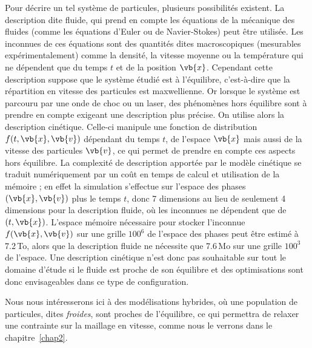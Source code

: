 Pour décrire un tel système de particules, plusieurs possibilités existent. La description dite fluide, qui prend en compte les équations de la mécanique des fluides (comme les équations d’Euler ou de Navier-Stokes) peut être utilisée. Les inconnues de ces équations sont des quantités dites macroscopiques (mesurables expérimentalement) comme la densité, la vitesse moyenne ou la température qui ne dépendent que du temps $t$ et de la position $\vb{x}$. Cependant cette description suppose que le système étudié est à l’équilibre, c’est-à-dire que la répartition en vitesse des particules est maxwellienne. Or lorsque le système est parcouru par une onde de choc ou un laser, des phénomènes hors équilibre sont à prendre en compte exigeant une description plus précise. On utilise alors la description cinétique. Celle-ci manipule une fonction de distribution $f(t,\vb{x},\vb{v})$ dépendant du temps $t$, de l’espace $\vb{x}$ mais aussi de la vitesse des particules $\vb{v}$, ce qui permet de prendre en compte ces aspects hors équilibre. La complexité de description apportée par le modèle cinétique se traduit numériquement par un coût en temps de calcul et utilisation de la mémoire ; en effet la simulation s’effectue sur l'espace des phases $(\vb{x},\vb{v})$ plus le temps $t$, donc 7 dimensions au lieu de seulement 4 dimensions pour la description fluide, où les inconnues ne dépendent que de $(t,\vb{x})$. L’espace mémoire nécessaire pour stocker l'inconnue $f(\vb{x},\vb{v})$ sur une grille $100^6$ de l’espace des phases peut être estimé à 7.2\,To, alors que la description fluide ne nécessite que 7.6\,Mo sur une grille $100^3$ de l’espace. Une description cinétique n’est donc pas souhaitable sur tout le domaine d’étude si le fluide est proche de son équilibre et des optimisations sont donc envisageables dans ce type de configuration.

Nous nous intéresserons ici à des modélisations hybrides, où une population de particules, dites \emph{froides}, sont proches de l'équilibre, ce qui permettra de relaxer une contrainte sur la maillage en vitesse, comme nous le verrons dans le chapitre~\ref{chap2}. 
